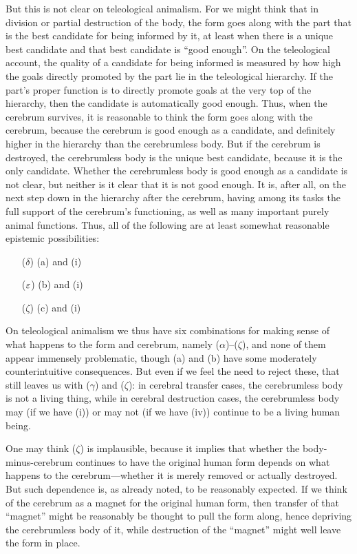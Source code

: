 But this is not clear on teleological animalism. For we might think that in division or partial destruction of the body, the form 
goes along with the part that is the best candidate for being informed by it, at least when there is a unique best candidate and that best 
candidate is ``good enough''. On the teleological account, the quality of a candidate for being informed is measured 
by how high the goals directly promoted by the part lie in the teleological hierarchy. If the part's
proper function is to directly promote goals at the very top of the hierarchy, then the candidate is automatically
good enough. Thus, when the cerebrum survives, it is reasonable to think the form goes along with the cerebrum, because the cerebrum
is good enough as a candidate, and definitely higher in the hierarchy than the cerebrumless body. But if the cerebrum is destroyed, the cerebrumless
body is the unique best candidate, because it is the only candidate. Whether the cerebrumless body is good enough as a candidate is not clear, but neither is it
clear that it is not good enough. It is, after all, on the next step down in the hierarchy after the cerebrum, having among its tasks the full
support of the cerebrum's functioning, as well as many important purely animal functions. Thus, all of the following are at least somewhat reasonable 
epistemic possibilities:
\begin{itemize}
\item[($\delta$)] (a) and (i)
\item[($\varepsilon$)] (b) and (i)
\item[($\zeta$)] (c) and (i)
\end{itemize}

On teleological animalism we thus have six combinations for making sense of what happens to the form and cerebrum, namely ($\alpha$)--($\zeta$), 
and none of them appear immensely problematic, though (a) and (b) have some moderately counterintuitive consequences. But even if we feel
the need to reject these, that still leaves us with ($\gamma$) and ($\zeta$): in cerebral transfer cases, the cerebrumless body is not a living
thing, while in cerebral destruction cases, the cerebrumless body may (if we have (i)) or may not (if we have (iv)) continue to be a living
human being. 

One may think ($\zeta$) is implausible, because it implies that whether the body-minus-cerebrum continues to have the original human
form depends on what happens to the cerebrum---whether it is merely removed or actually destroyed. But such dependence is, as already
noted, to be reasonably expected. If we think of the cerebrum as a magnet for the original human form, then transfer of that ``magnet''
might be reasonably be thought to pull the form along, hence depriving the cerebrumless body of it, while destruction of the ``magnet'' might
well leave the form in place. 

